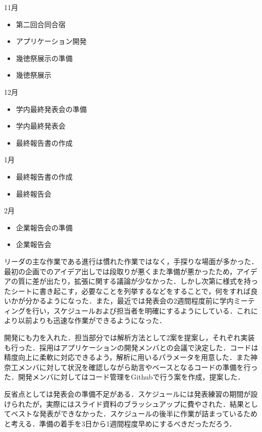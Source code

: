 11月
\begin{itemize}
\item 第二回合同合宿
\item アプリケーション開発
\item 幾徳祭展示の準備
\item 幾徳祭展示
\end{itemize}
12月
\begin{itemize}
\item 学内最終発表会の準備
\item 学内最終発表会
\item 最終報告書の作成
\end{itemize}
1月
\begin{itemize}
\item 最終報告書の作成
\item 最終報告会
\end{itemize}
2月
\begin{itemize}
\item 企業報告会の準備
\item 企業報告会
\end{itemize}

\par リーダの主な作業である進行は慣れた作業ではなく，手探りな場面が多かった．最初の企画でのアイデア出しでは段取りが悪くまた準備が悪かったため，アイデアの質に差が出たり，拡張に関する議論が少なかった．しかし次第に様式を持ったシートに書き起こす，必要なことを列挙するなどをすることで，何をすれば良いかが分かるようになった．また，最近では発表会の2週間程度前に学内ミーティングを行い，スケジュールおよび担当者を明確にするようにしている．これにより以前よりも迅速な作業ができるようになった．
\par 開発にも力を入れた．担当部分では解析方法として2案を提案し，それぞれ実装も行った．採用はアプリケーションの開発メンバとの会議で決定した．コードは精度向上に柔軟に対応できるよう，解析に用いるパラメータを用意した．また神奈工メンバに対して状況を確認しながら助言やベースとなるコードの準備を行った．開発メンバに対してはコード管理をGithubで行う案を作成，提案した．
\par 反省点としては発表会の準備不足がある．スケジュールには発表練習の期間が設けられたが，実際にはスライド資料のブラッシュアップに費やされた．結果としてベストな発表ができなかった．スケジュールの後半に作業が詰まっているためと考える．準備の着手を3日から1週間程度早めにするべきだっただろう．


